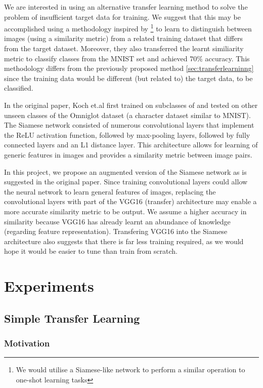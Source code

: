 \documentclass{article}
\begin{document}
We are interested in using an alternative transfer learning method to solve the problem of insufficient target data for training. We suggest that this may be accomplished using a methodology inspired by \cite{koch}\footnote{We would utilise a Siamese-like network to perform a similar operation to one-shot learning tasks} to learn to distinguish between images (using a similarity metric) from a related training dataset that differs from the target dataset. Moreover, they also transferred the learnt similiarity metric to classify classes from the MNIST set and achieved $70\%$ accuracy. This methodology differs from the previously proposed method \ref{sec:transferlearninng} since the training data would be different (but related to) the target data, to be classified.

In the original paper, Koch et.al first trained on subclasses of and tested on other unseen classes of the Omniglot dataset (a character dataset similar to MNIST). The Siamese network consisted of numerous convolutional layers that implement the ReLU activation function, followed by max-pooling layers, followed by fully connected layers and an L1 distance layer. This architecture allows for learning of generic features in images and provides a similarity metric between image pairs.

In this project, we propose an augmented version of the Siamese network as is suggested in the original paper. Since training convolutional layers could allow the neural network to learn general features of images, replacing the convolutional layers with part of the VGG16 (transfer) architecture may enable a more accurate similarity metric to be output. We assume a higher accuracy in similarity because VGG16 has already learnt an abundance of knowledge (regarding feature representation). Transfering VGG16 into the Siamese architecture also suggests that there is far less training required, as we would hope it would be easier to tune than train from scratch.

\section{Experiments}
\label{sec:experiments}

\subsection{Simple Transfer Learning}

\subsubsection{\textbf{Motivation}}
\end{document}
